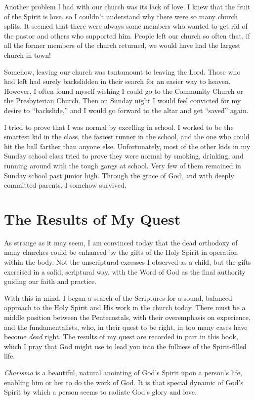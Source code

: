 Another problem I had with our church was its lack
of love. I knew that the fruit of the Spirit is love, so I
couldn’t understand why there were so many church splits.
It seemed that there were always some members who
wanted to get rid of the pastor and others who supported
him. People left our church so often that, if all the former
members of the church returned, we would have had the
largest church in town!

Somehow, leaving our church was tantamount to leaving
the Lord. Those who had left had surely backslidden in
their search for an easier way to heaven. However, I often
found myself wishing I could go to the Community Church
or the Presbyterian Church. Then on Sunday night I would
feel convicted for my desire to “backslide,” and I would go
forward to the altar and get “saved” again.

I tried to prove that I was normal by excelling in school.
I worked to be the smartest kid in the class, the fastest
runner in the school, and the one who could hit the ball
farther than anyone else. Unfortunately, most of the other
kids in my Sunday school class tried to prove they were
normal by smoking, drinking, and running around with
the tough gangs at school. Very few of them remained in
Sunday school past junior high. Through the grace of God,
and with deeply committed parents, I somehow survived.


\section*{The Results of My Quest}

As strange as it may seem, I am convinced today that
the dead orthodoxy of many churches could be enhanced
by the gifts of the Holy Spirit in operation within the body.
Not the unscriptural excesses I observed as a child, but the
gifts exercised in a solid, scriptural way, with the Word of
God as the final authority guiding our faith and practice.

With this in mind, I began a search of the Scriptures
for a sound, balanced approach to the Holy Spirit and His
work in the church today. There must be a middle position
between the Pentecostals, with their overemphasis on experience,
and the fundamentalists, who, in their quest to be
right, in too many cases have become \emph{dead} right. The results
of my quest are recorded in part in this book, which I pray
that God might use to lead you into the fullness of the
Spirit-filled life.

\emph{Charisma} is a beautiful, natural anointing of God’s Spirit
upon a person’s life, enabling him or her to do the work of
God. It is that special dynamic of God’s Spirit by which a
person seems to radiate God’s glory and love.


